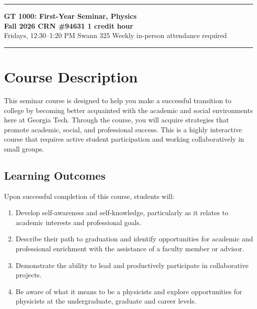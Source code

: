 \documentclass[11pt]{article}
\begin{document}
\noindent\textcolor{GTGold}{\rule{\textwidth}{4pt}}
\vspace{-0.2em}

\begingroup
\setlength{\fboxsep}{14pt}
\noindent\colorbox{GTLightGold}{%
\parbox{\dimexpr\textwidth-2\fboxsep\relax}{%
    {\LARGE\bfseries\textcolor{GTNavy}{GT 1000: First-Year Seminar, Physics}}\\[0.45em]
    {\normalsize\bfseries Fall 2026 \textbar{} CRN \#94631 \textbar{} 1 credit hour}\\[0.25em]
    {\normalsize Fridays, 12:30--1:20 PM \textbullet{} Swann 325
    \textbullet{} Weekly in-person attendance required}
}}
\endgroup

\vspace{0.1em}
\noindent\textcolor{GTLightGray}{\rule{\textwidth}{0.5pt}}

\section*{Course Description}

This seminar course is designed to help you make a successful transition
to college by becoming better acquainted with the academic and social
environments here at Georgia Tech. Through the course, you will acquire
strategies that promote academic, social, and professional success. This
is a highly interactive course that requires active student participation
and working collaboratively in small groups.

\subsection*{Learning Outcomes}

Upon successful completion of this course, students will:
\begin{enumerate}
    \item Develop self-awareness and self-knowledge, particularly as it
    relates to academic interests and professional goals.

    \item Describe their path to graduation and identify opportunities
    for academic and professional enrichment with the assistance of a
    faculty member or advisor.

    \item Demonstrate the ability to lead and productively participate
    in collaborative projects.

    \item Be aware of what it means to be a physicists and explore opportunities for physicists at the undergraduate, graduate and career levels.
\end{enumerate}
\end{document}

